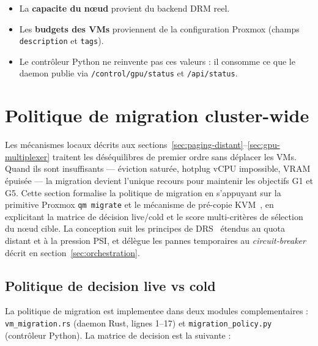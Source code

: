 \begin{itemize}
    \item La \textbf{capacite du nœud} provient du backend DRM reel.
    \item Les \textbf{budgets des VMs} proviennent de la configuration Proxmox (champs \texttt{description} et \texttt{tags}).
    \item Le contrôleur Python ne reinvente pas ces valeurs : il consomme ce que le daemon publie via \texttt{/control/gpu/status} et \texttt{/api/status}.
\end{itemize}

\section{Politique de migration cluster-wide}
\label{sec:migration}

Les mécanismes locaux décrits aux sections~\ref{sec:paging-distant}--\ref{sec:gpu-multiplexer} traitent les déséquilibres de premier ordre sans déplacer les VMs. Quand ils sont insuffisants --- éviction saturée, hotplug vCPU impossible, VRAM épuisée --- la migration devient l'unique recours pour maintenir les objectifs G1 et G5. Cette section formalise la politique de migration en s'appuyant sur la primitive Proxmox \texttt{qm migrate} et le mécanisme de pré-copie KVM~\cite{clark_2005}, en explicitant la matrice de décision live/cold et le score multi-critères de sélection du nœud cible. La conception suit les principes de DRS~\cite{gulati_2012_drs} étendus au quota distant et à la pression PSI, et délègue les pannes temporaires au \textit{circuit-breaker} décrit en section~\ref{sec:orchestration}.

\subsection{Politique de decision live vs cold}
\label{subsec:live-vs-cold}

La politique de migration est implementee dans deux modules complementaires : \texttt{vm\_migration.rs} (daemon Rust, lignes 1--17) et \texttt{migration\_policy.py} (contrôleur Python). La matrice de decision est la suivante :

